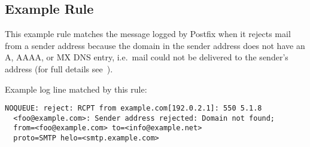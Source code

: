 \subsection{Example Rule}

\label{example rule in implementation}

This example rule matches the message logged by Postfix when it rejects
mail from a sender address because the domain in the sender address does
not have an A, AAAA, or MX DNS entry, i.e.\ mail could not be delivered
to the sender's address (for full details
see~\cite{reject-unknown-sender-domain}).

Example log line matched by this rule:


\begin{verbatim}
NOQUEUE: reject: RCPT from example.com[192.0.2.1]: 550 5.1.8
  <foo@example.com>: Sender address rejected: Domain not found;
  from=<foo@example.com> to=<info@example.net>
  proto=SMTP helo=<smtp.example.com>
\end{verbatim}

